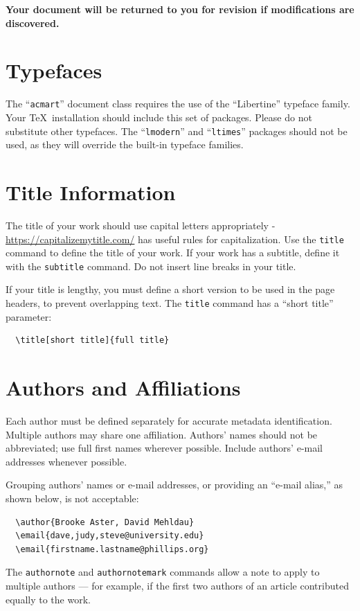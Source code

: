 \documentclass[sigplan,screen,anonymous]{acmart}
\begin{document}
{\bf Your document will be returned to you for revision if modifications are discovered.}

\section{Typefaces}

The ``\verb|acmart|'' document class requires the use of the ``Libertine'' typeface family. Your \TeX\ installation should include this set of packages. Please do not substitute other typefaces. The ``\verb|lmodern|'' and ``\verb|ltimes|'' packages should not be used, as they will override the built-in typeface families.

\section{Title Information}

The title of your work should use capital letters appropriately - \url{https://capitalizemytitle.com/} has useful rules for capitalization. Use the {\verb|title|} command to define the title of your work. If your work has a subtitle, define it with the {\verb|subtitle|} command.
Do not insert line breaks in your title.

If your title is lengthy, you must define a short version to be used in the page headers, to prevent overlapping text. The \verb|title| command has a ``short title'' parameter:
\begin{verbatim}
  \title[short title]{full title}
\end{verbatim}

\section{Authors and Affiliations}

Each author must be defined separately for accurate metadata identification. Multiple authors may share one affiliation. Authors' names should not be abbreviated; use full first names wherever possible. Include authors' e-mail addresses whenever possible.

Grouping authors' names or e-mail addresses, or providing an ``e-mail alias,'' as shown below, is not acceptable:
\begin{verbatim}
  \author{Brooke Aster, David Mehldau}
  \email{dave,judy,steve@university.edu}
  \email{firstname.lastname@phillips.org}
\end{verbatim}

The \verb|authornote| and \verb|authornotemark| commands allow a note to apply to multiple authors --- for example, if the first two authors of an article contributed equally to the work.
\end{document}
